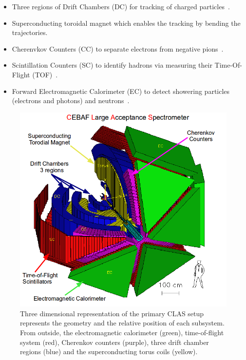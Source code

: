 \documentclass[twocolumn,showpacs,superscriptaddress,groupedaddress]{revtex4}
\begin{document}
\begin{itemize}
 \item Three regions of Drift Chambers (DC) for tracking of charged 
    particles~\cite{DCref}.
 \item Superconducting toroidal magnet which enables the tracking by bending 
    the trajectories.
 \item Cherenvkov Counters (CC) to separate electrons from negative 
    pions~\cite{CCref}.
 \item Scintillation Counters (SC) to identify hadrons via measuring their 
    Time-Of-Flight (TOF)~\cite{TOFref}.
 \item Forward Electromagnetic Calorimeter (EC) to detect showering particles 
    (electrons and photons) and neutrons~\cite{ECref}.
\end{itemize}

\begin{figure}[tbp]
\centering \includegraphics[scale=0.3]{fig/test_clas.png}
\caption{Three dimensional representation of the primary CLAS setup represents 
   the geometry and the relative position of each subsystem. From outside, the 
electromagnetic calorimeter (green), time-of-flight system (red), Cherenkov 
counters (purple), three drift chamber regions (blue) and the superconducting 
torus coils (yellow).} 
\label{fig:CLAS}
\end{figure}
\end{document}
